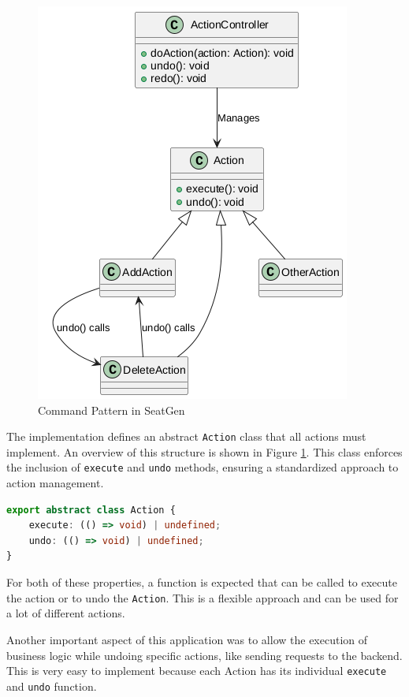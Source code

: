 \begin{figure}[H]
    \centering
    \includegraphics[scale=0.5]{pics/command-pattern.png}
    \caption{Command Pattern in SeatGen}
    \label{fig:command-pattern}
\end{figure}

The implementation defines an abstract \texttt{Action} class that all actions must implement. An overview of this structure is shown in Figure \ref{fig:command-pattern}. This class enforces the inclusion of \texttt{execute} and \texttt{undo} methods, ensuring a standardized approach to action management.

\begin{lstlisting}[language=TypeScript,caption={Action Class},label={lst:action-class}]
export abstract class Action {
    execute: (() => void) | undefined;
    undo: (() => void) | undefined;
}
\end{lstlisting}

For both of these properties, a function is expected that can be called to execute the action or to undo the \texttt{Action}. This is a flexible approach and can be used for a lot of different actions. 

Another important aspect of this application was to allow the execution of business logic while undoing specific actions, like sending requests to the backend. This is very easy to implement because each Action has its individual \texttt{execute} and \texttt{undo} function.

